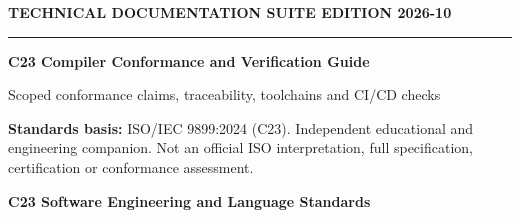 \documentclass[10pt,letterpaper,oneside]{report}
\begin{document}
\hypersetup{pageanchor=false}%
\begin{titlepage}
\color{ink}\vspace*{1.2in}
{\sffamily\small\color{accent}\bfseries TECHNICAL DOCUMENTATION SUITE \hfill EDITION 2026-10}\par
\vspace{.3in}\rule{\linewidth}{1.5pt}\par\vspace{.22in}
{\Huge\bfseries C23 Compiler Conformance and Verification Guide}\par\vspace{.22in}
{\Large\color{grayblue}Scoped conformance claims, traceability, toolchains and CI/CD checks}\par\vspace{.4in}
\begin{keybox}\textbf{Standards basis:} ISO/IEC 9899:2024 (C23). Independent educational and engineering companion. Not an official ISO interpretation, full specification, certification or conformance assessment.\end{keybox}
\vfill{\large\bfseries C23 Software Engineering and Language Standards}\par{}\par
\end{titlepage}\hypersetup{pageanchor=true}
\tableofcontents\clearpage{}
\end{document}
